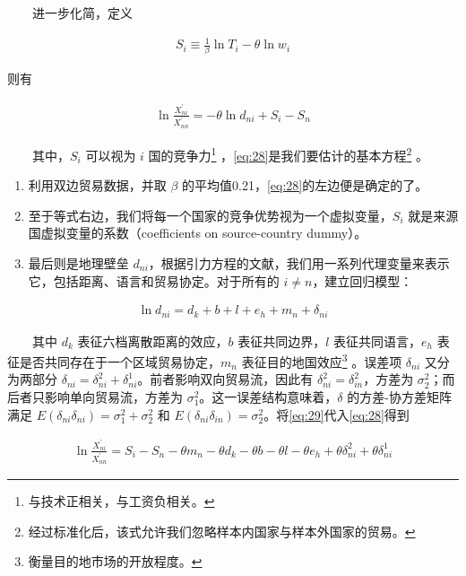 \documentclass[
]{article}
\providecommand{\tightlist}{%
  \setlength{\itemsep}{0pt}\setlength{\parskip}{0pt}}
\begin{document}
　　进一步化简，定义

\begin{align}
S_i \equiv \frac{1}{\beta} \ln T_i - \theta \ln w_i \label{eq:27}
\end{align}

则有

\begin{align}
\ln \frac{X_{n i}^{\prime}}{X_{n n}^{\prime}}=-\theta \ln d_{n i}+S_i-S_n \label{eq:28}
\end{align}

　　其中，\(S_i\) 可以视为 \(i\) 国的竞争力\footnote{与技术正相关，与工资负相关。} ，\eqref{eq:28}是我们要估计的基本方程\footnote{经过标准化后，该式允许我们忽略样本内国家与样本外国家的贸易。} 。

\begin{enumerate}
\def\labelenumi{\arabic{enumi}.}
\tightlist
\item
  利用双边贸易数据，并取 \(\beta\) 的平均值0.21，\eqref{eq:28}的左边便是确定的了。\\
\item
  至于等式右边，我们将每一个国家的竞争优势视为一个虚拟变量，\(S_i\) 就是来源国虚拟变量的系数（coefficients on source-country dummy）。\\
\item
  最后则是地理壁垒 \(d_{ni}\)，根据引力方程的文献，我们用一系列代理变量来表示它，包括距离、语言和贸易协定。对于所有的 \(i \neq n\)，建立回归模型：
\end{enumerate}

\begin{align}
\ln d_{n i}=d_{k}+b+l+e_{h}+m_{n}+\delta_{n i} \label{eq:29}
\end{align}

　　其中 \(d_k\) 表征六档离散距离的效应，\(b\) 表征共同边界，\(l\) 表征共同语言，\(e_h\) 表征是否共同存在于一个区域贸易协定，\(m_n\) 表征目的地国效应\footnote{衡量目的地市场的开放程度。} 。误差项 \(\delta_{n i}\) 又分为两部分 \(\delta_{n i} = \delta_{ni}^2 + \delta_{ni}^1\)。前者影响双向贸易流，因此有 \(\delta_{ni}^2=\delta_{in}^2\)，方差为 \(\sigma_2^2\)；而后者只影响单向贸易流，方差为 \(\sigma_1^2\)。这一误差结构意味着，\(\delta\) 的方差-协方差矩阵满足 \(E(\delta_{ni}\delta_{ni})=\sigma_1^2+\sigma_2^2\) 和 \(E(\delta_{ni}\delta_{in})=\sigma_2^2\)。将\eqref{eq:29}代入\eqref{eq:28}得到

\begin{align}
\ln \frac{X_{n i}^{\prime}}{X_{n n}^{\prime}}=S_{i}-S_{n}-\theta m_{n}-\theta d_{k}-\theta b-\theta l-\theta e_{h}+\theta \delta_{n i}^{2}+\theta \delta_{n i}^{1} \label{eq:30}
\end{align}
\end{document}
